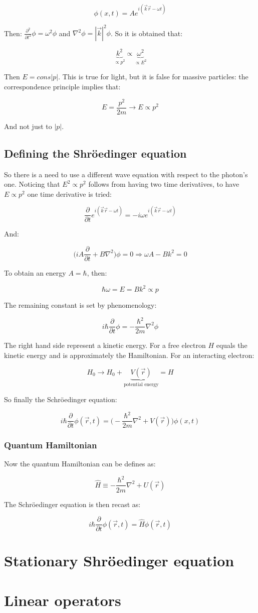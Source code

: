   $$\phi(x,t) = Ae^{i(\vec{k}\vec{r}-\omega t)}$$

  Then: $\frac{\partial^2{}}{\partial{t^2}}\phi = \omega^2\phi$ and $\nabla^2\phi = |\vec{k}|^2\phi$.
  So it is obtained that: 

  $$\underbrace{k^2}_{\propto p^2}\propto\underbrace{\omega^2}_{\propto E^2}$$

  Then $E = cons|p|$.
  This is true for light, but it is false for massive particles: the correspondence principle implies that:

  $$E = \frac{p^2}{2m}\rightarrow E\propto p^2$$

  And not just to $|p|$.

  \subsection{Defining the Shr\"oedinger equation}
  So there is a need to use a different wave equation with respect to the photon's one.
  Noticing that $E^2\propto p^2$ follows from having two time derivatives, to have $E\propto p^2$ one time derivative is tried:

  $$\frac{\partial {}}{\partial {t}}e^{i(\vec{k}\vec{r}-\omega t)} = -i\omega e^{i(\vec{k}\vec{r}-\omega t)}$$

  And:

  $$\biggl(iA \frac{\partial {}}{\partial {t}}+ B\nabla^2\biggr)\phi = 0\Rightarrow \omega A - B k^2 = 0$$

  To obtain an energy $A = \hbar$, then:

  $$\hbar\omega = E = Bk^2\propto p$$

  The remaining constant is set by phenomenology:

  $$i\hbar \frac{\partial {}}{\partial {t}}\phi = -\frac{\hbar^2}{2m}\nabla^2\phi$$

  The right hand side represent a kinetic energy.
  For a free electron $H$ equals the kinetic energy and is approximately the Hamiltonian.
  For an interacting electron:

  $$H_0 \rightarrow H_0 + \underbrace{V(\vec{r})}_{\text{potential energy}} = H$$

  So finally the Schr\"oedinger equation:

  $$i\hbar \frac{\partial {}}{\partial {t}}\phi(\vec{r},t) = \biggl(-\frac{\hbar^2}{2m}\nabla^2+V(\vec{r})\biggr)\phi(x,t)$$

    \subsubsection{Quantum Hamiltonian}
    Now the quantum Hamiltonian can be defines as:

    $$\hat{H} \equiv -\frac{\hbar^2}{2m}\nabla^2+U(\vec{r})$$

    The Schr\"oedinger equation is then recast as:

    $$i\hbar \frac{\partial {}}{\partial {t}}\phi(\vec{r},t) = \hat{H} \phi(\vec{r},t)$$

\section{Stationary Shr\"oedinger equation}

\section{Linear operators}
